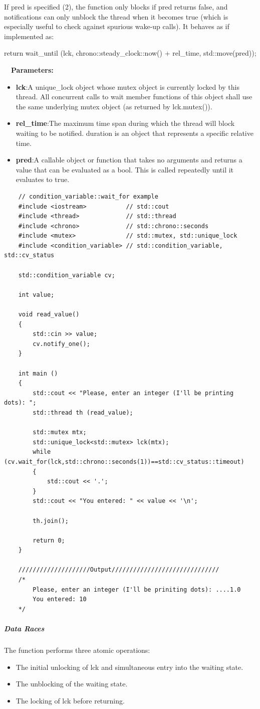 \documentclass[UTF8,a4paper,12pt]{ctexbook}
\begin{document}
			If pred is specified (2), the function only blocks if pred returns false, and notifications can only unblock the thread when it becomes true (which is especially useful to check against spurious wake-up calls). It behaves as if implemented as:
			
			return wait\_until (lck, chrono::steady\_clock::now() + rel\_time, std::move(pred));
				
			\ \ \textbf{Parameters:}
			\begin{itemize}[itemindent = 1em]
				\item \textbf{lck}:A unique\_lock object whose mutex object is currently locked by this thread.
				All concurrent calls to wait member functions of this object shall use the same underlying mutex object (as returned by lck.mutex()).
				\item \textbf{rel\_time}:The maximum time span during which the thread will block waiting to be notified.
				duration is an object that represents a specific relative time.
				\item \textbf{pred}:A callable object or function that takes no arguments and returns a value that can be evaluated as a bool.
				This is called repeatedly until it evaluates to true.
			\end{itemize}
\begin{lstlisting}
	// condition_variable::wait_for example
	#include <iostream>           // std::cout
	#include <thread>             // std::thread
	#include <chrono>             // std::chrono::seconds
	#include <mutex>              // std::mutex, std::unique_lock
	#include <condition_variable> // std::condition_variable, std::cv_status
	
	std::condition_variable cv;
	
	int value;
	
	void read_value() 
	{
		std::cin >> value;
		cv.notify_one();
	}
	
	int main ()
	{
		std::cout << "Please, enter an integer (I'll be printing dots): ";
		std::thread th (read_value);
		
		std::mutex mtx;
		std::unique_lock<std::mutex> lck(mtx);
		while (cv.wait_for(lck,std::chrono::seconds(1))==std::cv_status::timeout) 
		{
			std::cout << '.';
		}
		std::cout << "You entered: " << value << '\n';
		
		th.join();
		
		return 0;
	}
	
	////////////////////Output//////////////////////////////
	/*
		Please, enter an integer (I'll be priniting dots): ....1.0
		You entered: 10
	*/
\end{lstlisting}
			\subparagraph{Data Races}The function performs three atomic operations:
			\begin{itemize}[itemindent = 1em]
				\item The initial unlocking of lck and simultaneous entry into the waiting state.
				\item The unblocking of the waiting state.
				\item The locking of lck before returning.
			\end{itemize}
			
\end{document}
